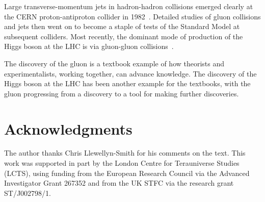 \documentclass{ws-rv975x65}[12pt]
\begin{document}
Large transverse-momentum jets in hadron-hadron collisions emerged clearly at the CERN
proton-antiproton collider in 1982~\cite{UA2}. Detailed studies of gluon collisions and jets then went
on to become a staple of tests of the Standard Model at subsequent colliders. Most recently,
the dominant mode of production of the Higgs boson at the LHC is via gluon-gluon
collisions~\cite{H}.

The discovery of the gluon is a textbook example of how theorists and experimentalists,
working together, can advance knowledge. The discovery of the Higgs boson at the LHC
has been another example for the textbooks, with the gluon progressing from a discovery
to a tool for making further discoveries. 

\section*{Acknowledgments}
The author thanks Chris Llewellyn-Smith for his comments on the text.
This work was supported in part by the London Centre for Terauniverse Studies
(LCTS), using funding from the European Research Council via the Advanced Investigator
Grant 267352 and from the UK STFC via the research grant ST/J002798/1.
\end{document}
